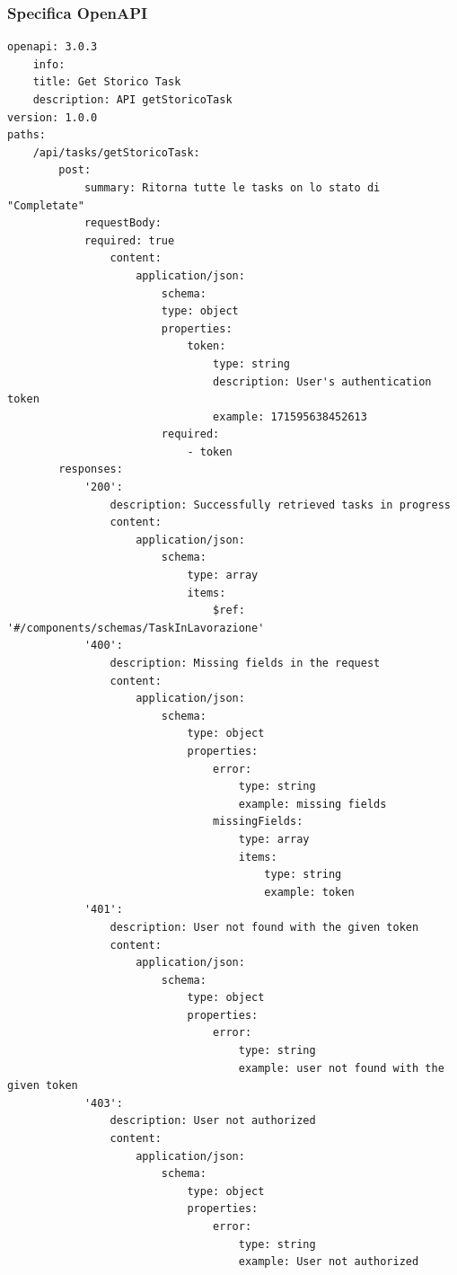 \documentclass{report}
\begin{document}
\subsubsection*{Specifica OpenAPI}
\begin{verbatim}
openapi: 3.0.3
    info:
    title: Get Storico Task
    description: API getStoricoTask
version: 1.0.0
paths:
    /api/tasks/getStoricoTask:
        post:
            summary: Ritorna tutte le tasks on lo stato di "Completate"
            requestBody:
            required: true
                content:
                    application/json:
                        schema:
                        type: object
                        properties:
                            token:
                                type: string
                                description: User's authentication token
                                example: 171595638452613
                        required:
                            - token
        responses:
            '200':
                description: Successfully retrieved tasks in progress
                content:
                    application/json:
                        schema:
                            type: array
                            items:
                                $ref: '#/components/schemas/TaskInLavorazione'
            '400':
                description: Missing fields in the request
                content:
                    application/json:
                        schema:
                            type: object
                            properties:
                                error:
                                    type: string
                                    example: missing fields
                                missingFields:
                                    type: array
                                    items:
                                        type: string
                                        example: token
            '401':
                description: User not found with the given token
                content:
                    application/json:
                        schema:
                            type: object
                            properties:
                                error:
                                    type: string
                                    example: user not found with the given token
            '403':
                description: User not authorized
                content:
                    application/json:
                        schema:
                            type: object
                            properties:
                                error:
                                    type: string
                                    example: User not authorized
\end{verbatim}
\end{document}

